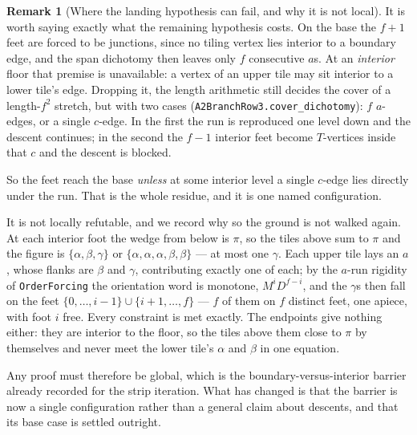 \documentclass[11pt,reqno]{amsart}
\theoremstyle{plain}
\theoremstyle{definition}
\newtheorem{remark}[theorem]{Remark}
\begin{document}
\begin{remark}[Where the landing hypothesis can fail, and why it is not local]\label{rem:landingfail}
It is worth saying exactly what the remaining hypothesis costs. On the base the $f+1$ feet are
forced to be junctions, since no tiling vertex lies interior to a boundary edge, and the span
dichotomy then leaves only $f$ consecutive $a$s. At an \emph{interior} floor that premise is
unavailable: a vertex of an upper tile may sit interior to a lower tile's edge. Dropping it, the
length arithmetic still decides the cover of a length-$f^2$ stretch, but with two cases
(\texttt{A2BranchRow3.cover\_dichotomy}): $f$ $a$-edges, or a single $c$-edge. In the first the run
is reproduced one level down and the descent continues; in the second the $f-1$ interior feet become
$T$-vertices inside that $c$ and the descent is blocked.

So the feet reach the base \emph{unless} at some interior level a single $c$-edge lies directly
under the run. That is the whole residue, and it is one named configuration.

It is not locally refutable, and we record why so the ground is not walked again. At each interior
foot the wedge from below is $\pi$, so the tiles above sum to $\pi$ and the figure is
$\{\alpha,\beta,\gamma\}$ or $\{\alpha,\alpha,\alpha,\beta,\beta\}$ --- at most one
$\gamma$. Each upper tile lays an $a$, whose flanks are $\beta$ and $\gamma$, contributing exactly
one of each; by the $a$-run rigidity of \texttt{OrderForcing} the orientation word is monotone,
$M^iD^{f-i}$, and the $\gamma$s then fall on the feet $\{0,\dots,i-1\}\cup\{i+1,\dots,f\}$ ---
$f$ of them on $f$ distinct feet, one apiece, with foot $i$ free. Every constraint is met exactly.
The endpoints give nothing either: they are interior to the floor, so the tiles above them close to
$\pi$ by themselves and never meet the lower tile's $\alpha$ and $\beta$ in one equation.

Any proof must therefore be global, which is the boundary-versus-interior barrier already recorded
for the strip iteration. What has changed is that the barrier is now a single configuration rather
than a general claim about descents, and that its base case is settled outright.


\end{remark}
\end{document}
